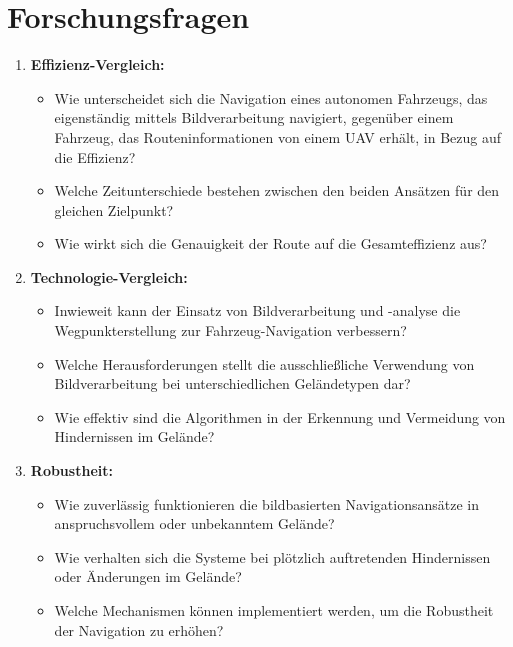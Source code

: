 \section{Forschungsfragen}

\begin{enumerate}
    \item \textbf{Effizienz-Vergleich:}
    \begin{itemize}
        \item Wie unterscheidet sich die Navigation eines autonomen Fahrzeugs, das eigenständig mittels Bildverarbeitung navigiert, gegenüber einem Fahrzeug, das Routeninformationen von einem UAV erhält, in Bezug auf die Effizienz?
        \item Welche Zeitunterschiede bestehen zwischen den beiden Ansätzen für den gleichen Zielpunkt?
        \item Wie wirkt sich die Genauigkeit der Route auf die Gesamteffizienz aus?
    \end{itemize}
    
    \item \textbf{Technologie-Vergleich:}
    \begin{itemize}
      \item Inwieweit kann der Einsatz von Bildverarbeitung und -analyse die Wegpunkterstellung zur Fahrzeug-Navigation verbessern?
        \item Welche Herausforderungen stellt die ausschließliche Verwendung von Bildverarbeitung bei unterschiedlichen Geländetypen dar?
        \item Wie effektiv sind die Algorithmen in der Erkennung und Vermeidung von Hindernissen im Gelände?
    \end{itemize}
    
    \item \textbf{Robustheit:}
    \begin{itemize}
        \item Wie zuverlässig funktionieren die bildbasierten Navigationsansätze in anspruchsvollem oder unbekanntem Gelände?
        \item Wie verhalten sich die Systeme bei plötzlich auftretenden Hindernissen oder Änderungen im Gelände?
        \item Welche Mechanismen können implementiert werden, um die Robustheit der Navigation zu erhöhen?
    \end{itemize}
\end{enumerate}
